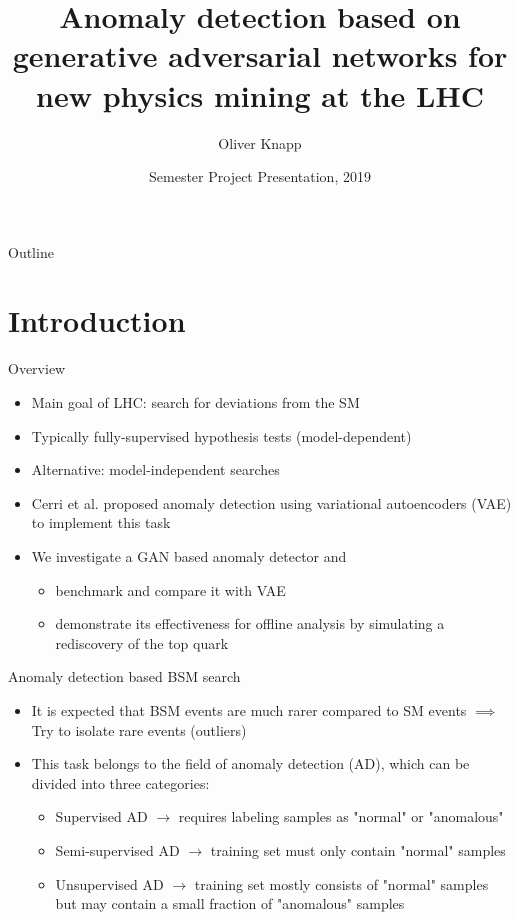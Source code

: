 \documentclass{beamer}
\title{Anomaly detection based on generative adversarial networks for new physics mining at the LHC}
\author{Oliver Knapp \inst{1}}
\institute[Swiss Federal Institute of Technology] %
{
  \inst{1}%
  Department of Physics \\
  Swiss Federal Institute of Technology
}
\date{Semester Project Presentation, 2019}
\newcommand{\cmark}{\ding{51}}%
\newcommand{\xmark}{\ding{55}}%
\begin{document}
\begin{frame}
  \titlepage
\end{frame}

\begin{frame}{Outline}
  \tableofcontents
\end{frame}

\section{Introduction}

\begin{frame}{Overview}
  \begin{itemize}
      \item Main goal of LHC: search for deviations from the SM \pause
      \item Typically fully-supervised hypothesis tests (model-dependent) \pause
      \item Alternative: model-independent searches \pause
      \item Cerri et al. proposed anomaly detection using variational autoencoders (VAE) to implement this task \pause
      \item We investigate a GAN based anomaly detector and
      \begin{itemize}
        \pause
        \item benchmark and compare it with VAE
        \pause
        \item demonstrate its effectiveness for offline analysis by simulating a rediscovery of the top quark
      \end{itemize}
  \end{itemize}
\end{frame}

\begin{frame}{Anomaly detection based BSM search}
  \begin{itemize}
      \item<1-> It is expected that BSM events are much rarer compared to SM events $\implies$ Try to isolate rare events (outliers)
      \item<2-> This task belongs to the field of anomaly detection (AD), which can be divided into three categories:
      \begin{itemize}
        \item<3-> Supervised AD $\rightarrow$ requires labeling samples as "normal" or "anomalous" \uncover<4->{\textcolor{red}{\xmark}}
        \item<5-> Semi-supervised AD $\rightarrow$ training set must only contain "normal" samples \uncover<6->{\textcolor{red}{\xmark}}
        \item<7-> Unsupervised AD $\rightarrow$ training set mostly consists of "normal" samples but may contain a small fraction of "anomalous" samples \uncover<8->{\textcolor{green}{\cmark}}
      \end{itemize}
  \end{itemize}
\end{frame}
\end{document}
